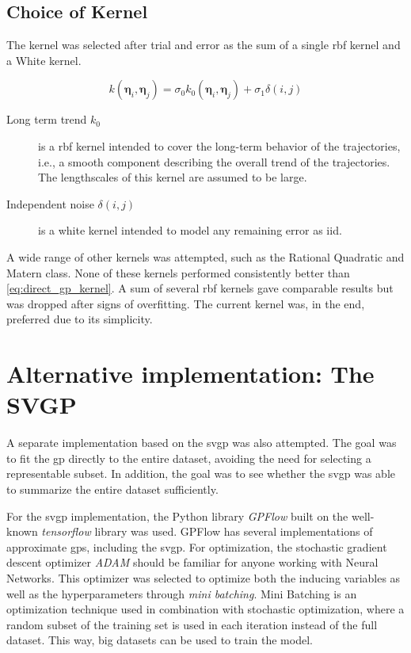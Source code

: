\subsection{Choice of Kernel}
The kernel was selected after trial and error as the sum of a single \acrshort{rbf} kernel and a White kernel.

\begin{equation}\label{eq:direct_gp_kernel}
    k(\boldsymbol{\eta}_i, \boldsymbol{\eta}_j) = \sigma_0 k_0(\boldsymbol{\eta}_i, \boldsymbol{\eta}_j) + \sigma_1 \delta(i, j)
\end{equation}

\begin{description}
    \item[Long term trend $k_0$] is a \acrshort{rbf} kernel intended to cover the long-term behavior of the trajectories, i.e., a smooth component describing the overall trend of the trajectories. The lengthscales of this kernel are assumed to be large.
    \item[Independent noise $\delta(i, j)$] is a white kernel intended to model any remaining error as \acrshort{iid}.
\end{description} 

A wide range of other kernels was attempted, such as the Rational Quadratic and Matern class. None of these kernels performed consistently better than \cref{eq:direct_gp_kernel}. A sum of several \acrshort{rbf} kernels gave comparable results but was dropped after signs of overfitting. The current kernel was, in the end, preferred due to its simplicity. 

\section{Alternative implementation: The SVGP}
A separate implementation based on the \acrshort{svgp} was also attempted. The goal was to fit the \acrshort{gp} directly to the entire dataset, avoiding the need for selecting a representable subset. In addition, the goal was to see whether the \acrshort{svgp} was able to summarize the entire dataset sufficiently.

For the \acrshort{svgp} implementation, the Python library \textit{GPFlow} \cite{GPflow2017} built on the well-known \textit{tensorflow} \cite{tensorflow2015-whitepaper} library was used. GPFlow has several implementations of approximate \acrshort{gp}s, including the \acrshort{svgp}. For optimization, the stochastic gradient descent optimizer \textit{ADAM} should be familiar for anyone working with Neural Networks. This optimizer was selected to optimize both the inducing variables as well as the hyperparameters through \textit{mini batching}. Mini Batching is an optimization technique used in combination with stochastic optimization, where a random subset of the training set is used in each iteration instead of the full dataset. This way, big datasets can be used to train the model.





